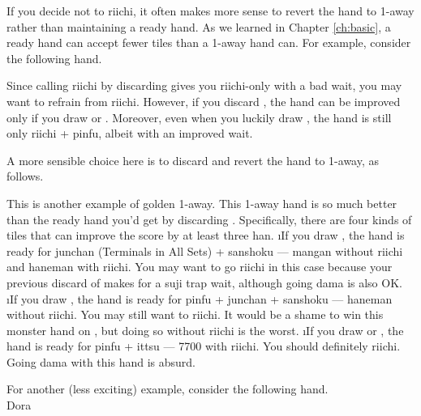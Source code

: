 \bigskip
If you decide not to riichi, it often makes more sense to revert the hand to 1-away rather than maintaining a ready hand. As we learned in Chapter \ref{ch:basic}, a ready hand can accept fewer tiles than a 1-away hand can. For example, consider the following hand.
\newpage
\bp
{}%
\ep

\bigskip
Since calling riichi by discarding {\LARGE {}} gives you riichi-only with a bad wait, you may want to refrain from riichi. However, if you discard {\LARGE {}}, the hand can be improved only if you draw {\LARGE {}} or {\LARGE {}}. Moreover, even when you luckily draw {\LARGE {}}, the hand is still only riichi + {\jap pinfu}, albeit with an improved wait. 

\bigskip
A more sensible choice here is to discard {\LARGE {}} and revert the hand to 1-away, as follows. 
\bp
{}%
\ep

\bigskip
This is another example of golden 1-away. 
This 1-away hand is so much better than the ready hand you'd get by discarding {\LARGE {}}. Specifically, there are four kinds of tiles that can improve the score by at least three {\jap han}. 
\bi {}
\i If you draw {\LARGE{}}, the hand is ready for {\jap junchan} (Terminals in All Sets) + {\jap sanshoku} --- {\jap mangan} without riichi and {\jap haneman} with riichi. You may want to go riichi in this case because your previous discard of {\LARGE {}} makes for a {\jap suji} trap wait, although going {\jap dama} is also OK. 
\i If you draw {\LARGE{}}, the hand is ready for {\jap pinfu + junchan + \linebreak sanshoku} --- {\jap haneman} without riichi. You may still want to riichi. It would be a shame to win this monster hand on {\LARGE{}}, but doing so without riichi is the worst. 
\newpage
\i If you draw {\LARGE{}} or {\LARGE{}}, the hand is ready for {\jap pinfu + ittsu} --- 7700 with riichi. You should definitely riichi. Going {\jap dama} with this hand is absurd.
\ei

For another (less exciting) example, consider the following hand.
\bp
{}~~\bei\\
\hfill\footnotesize{{\jap Dora}~~~~~~~~~~}
\ep

